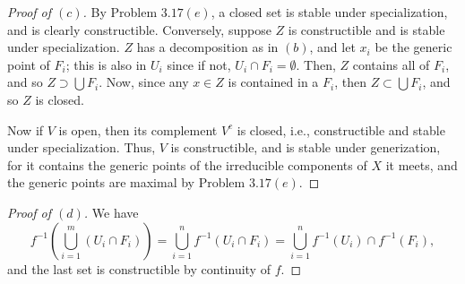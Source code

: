 \documentclass[12pt,letterpaper]{article}
\theoremstyle{definition}
\theoremstyle{remark}
\numberwithin{equation}{section}
\numberwithin{figure}{problem}
\begin{document}
\begin{proof}[Proof of $(c)$]
  By Problem $3.17(e)$, a closed set is stable under specialization, and is clearly constructible. Conversely, suppose $Z$ is constructible and is stable under specialization. $Z$ has a decomposition as in $(b)$, and let $x_i$ be the generic point of $F_i$; this is also in $U_i$ since if not, $U_i \cap F_i = \emptyset$. Then, $Z$ contains all of $F_i$, and so $Z \supset \bigcup F_i$. Now, since any $x \in Z$ is contained in a $F_i$, then $Z \subset \bigcup F_i$, and so $Z$ is closed.
  \par Now if $V$ is open, then its complement $V^c$ is closed, i.e., constructible and stable under specialization. Thus, $V$ is constructible, and is stable under generization, for it contains the generic points of the irreducible components of $X$ it meets, and the generic points are maximal by Problem $3.17(e)$.
\end{proof}
\begin{proof}[Proof of $(d)$]
  We have
  \begin{equation*}
    f^{-1}\left( \bigcup_{i=1}^m (U_i \cap F_i) \right) = \bigcup_{i=1}^n f^{-1}(U_i \cap F_i) = \bigcup_{i=1}^n f^{-1}(U_i) \cap f^{-1}(F_i),
  \end{equation*}
  and the last set is constructible by continuity of $f$.
\end{proof}
\end{document}
